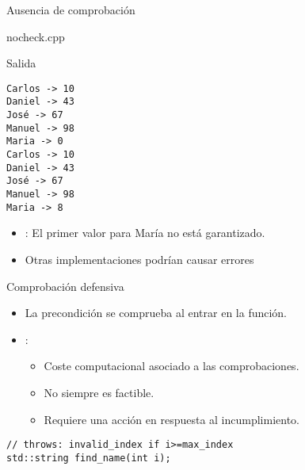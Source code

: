 \begin{frame}{Ausencia de comprobación}
\begin{block}{nocheck.cpp}
\end{block}
\end{frame}


\begin{frame}[fragile]{Salida}
\begin{lstlisting}[style=terminal]
Carlos -> 10
Daniel -> 43
José -> 67
Manuel -> 98
Maria -> 0
Carlos -> 10
Daniel -> 43
José -> 67
Manuel -> 98
Maria -> 8
\end{lstlisting}
\begin{itemize}
  \item {}: El primer valor para María no está garantizado.
  \item Otras implementaciones podrían causar errores
\end{itemize}
\end{frame}


\begin{frame}[t,fragile]{Comprobación defensiva}
\begin{itemize}
  \item La precondición se comprueba al entrar en la función.

  \item {}:
    \begin{itemize}
      \item Coste computacional asociado a las comprobaciones.
      \item No siempre es factible.
      \item Requiere una acción en respuesta al incumplimiento.
    \end{itemize}
\end{itemize}

\begin{lstlisting}
// throws: invalid_index if i>=max_index
std::string find_name(int i);
\end{lstlisting}
\end{frame}

